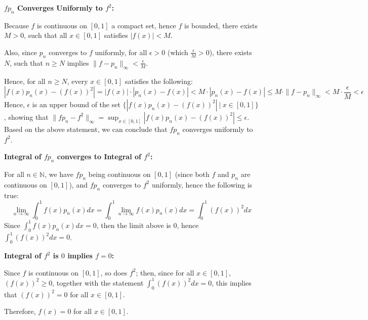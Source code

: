 \documentclass{article}
\begin{document}
\textbf{$fp_n$ Converges Uniformly to $f^2$:}

Because $f$ is continuous on $[0,1]$ a compact set, hence $f$ is bounded, there exists $M>0$, such that all $x\in[0,1]$ satisfies $|f(x)|<M$.

Also, since $p_n$ converges to $f$ uniformly, for all $\epsilon>0$ (which $\frac{\epsilon}{M}>0$), there exists $N$, such that $n\geq N$ implies $\|f-p_n\|_\infty <\frac{\epsilon}{M}$.

Hence, for all $n\geq N$, every $x\in[0,1]$ satisfies the following:
$$|f(x)p_n(x) - (f(x))^2| = |f(x)|\cdot |p_n(x)-f(x)| < M\cdot |p_n(x)-f(x)| \leq M\cdot \|f-p_n\|_\infty < M\cdot \frac{\epsilon}{M}<\epsilon$$
Hence, $\epsilon$ is an upper bound of the set $\{|f(x)p_n(x)-(f(x))^2|\ |\ x\in[0,1]\}$, showing that $\|fp_n-f^2\|_\infty = \sup_{x\in[0,1]}|f(x)p_n(x)-(f(x))^2| \leq \epsilon$.
Based on the above statement, we can conclude that $fp_n$ converges uniformly to $f^2$.

\hfill

\textbf{Integral of $fp_n$ converges to Integral of $f^2$:}

For all $n\in\mathbb{N}$, we have $fp_n$ being continuous on $[0,1]$ (since both $f$ and $p_n$ are continuous on $[0,1]$), and $fp_n$ converges to $f^2$ uniformly,
hence the following is true:
$$\lim_{n\rightarrow\infty}\int_{0}^{1}f(x)p_n(x)dx = \int_{0}^{1}\lim_{n\rightarrow\infty}f(x)p_n(x)dx = \int_{0}^{1}(f(x))^2dx$$
Since $\int_{0}^{1}f(x)p_n(x)dx = 0$, then the limit above is $0$, hence $\int_{0}^{1}(f(x))^2dx = 0$.

\hfill

\textbf{Integral of $f^2$ is $0$ implies $f=0$:}

Since $f$ is continuous on $[0,1]$, so does $f^2$; then, since for all $x\in[0,1]$, $(f(x))^2 \geq 0$, together with the statement $\int_{0}^{1}(f(x))^2dx = 0$,
this implies that $(f(x))^2 = 0$ for all $x\in[0,1]$.

Therefore, $f(x)=0$ for all $x\in[0,1]$.
\end{document}
